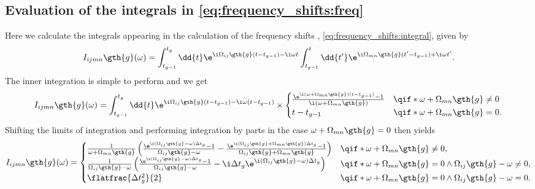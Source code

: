 \subsection{Evaluation of the integrals in \cref{eq:frequency_shifts:freq}}\label{appsec:derivations:frequency_shifts:integral}
Here we calculate the integrals appearing in the calculation of the frequency shifts \freqshifts, \cref{eq:frequency_shifts:integral}, given by
\begin{equation}
    I_{ijmn}\gth{g}(\omega) = \int_{t_{g-1}}^{t_g}\dd{t}\e^{\i\Omega_{ij}\gth{g}(t - t_{g-1}) - \i\omega t}
                              \int_{t_{g-1}}^{t}\dd{t'}\e^{\i\Omega_{mn}\gth{g}(t' - t_{g-1}) + \i\omega t'}.
\end{equation}
The inner integration is simple to perform and we get
\begin{equation}
    I_{ijmn}\gth{g}(\omega) = \int_{t_{g-1}}^{t_g}\dd{t}\e^{\i\Omega_{ij}\gth{g}(t - t_{g-1}) - \i\omega(t - t_{g-1})}\times
    \begin{cases}
        \frac{\e^{\i(\omega + \Omega_{mn}\gth{g})(t - t_{g-1})} - 1}{\i(\omega + \Omega_{mn}\gth{g})}   &\qif* \omega + \Omega_{mn}\gth{g}\neq 0 \\
        t - t_{g-1}                                                                                     &\qif* \omega + \Omega_{mn}\gth{g} = 0.
    \end{cases}
\end{equation}
Shifting the limits of integration and performing integration by parts in the case $\omega + \Omega_{mn}\gth{g} = 0$ then yields
\begin{equation}
    I_{ijmn}\gth{g}(\omega) = \begin{cases}
        \frac{1}{\omega + \Omega_{mn}\gth{g}}\left(
            \frac{\e^{\i(\Omega_{ij}\gth{g} - \omega)\Delta t_g} - 1}{\Omega_{ij}\gth{g} - \omega} -
            \frac{\e^{\i(\Omega_{ij}\gth{g} + \Omega_{mn}\gth{g})\Delta t_g} - 1}{\Omega_{ij}\gth{g} + \Omega_{mn}\gth{g}}
        \right) &\qif* \omega + \Omega_{mn}\gth{g}\neq 0, \\
        \frac{1}{\Omega_{ij}\gth{g} - \omega}\left(
            \frac{\e^{\i(\Omega_{ij}\gth{g} - \omega)\Delta t_g} - 1}{\Omega_{ij}\gth{g} - \omega} -
            \i\Delta t_g\e^{\i(\Omega_{ij}\gth{g} - \omega)\Delta t_g}
        \right) &\qif* \omega + \Omega_{mn}\gth{g} = 0 \wedge \Omega_{ij}\gth{g} - \omega\neq 0, \\
        \flatfrac{\Delta t_g^2}{2} &\qif* \omega + \Omega_{mn}\gth{g} = 0 \wedge \Omega_{ij}\gth{g} - \omega = 0.
    \end{cases}
\end{equation}

